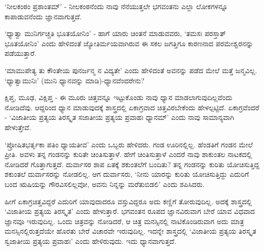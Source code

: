 `ನೀಲಕಂಠಂ ಪ್ರಶಾಂತಮ್' - ನೀಲಕಂಠನೆಂದು ನಾವು ನೆನೆಯುತ್ತಲೇ ಭಗವಂತನು ಎಲ್ಲಾ ಲೋಕಗಳನ್ನೂ ಕಾಪಾಡುವನೆಂದು ಜ್ಞಾನವಾಗುತ್ತದೆ.

`ಧ್ಯಾತ್ವಾ ಮುನಿರ್ಗಚ್ಚತಿ ಭೂತಯೋನಿಂ' - ಹಾಗೆ ಯಾರು ಚಿಂತನೆ ಮಾಡುವವರು, `ತಮಸಃ ಪರಸ್ತಾತ್ ಭೂತಯೋನಿಂ' ಎಂದು ಹೇಳಿದಂತೆ ಜ್ಯೋತಿರ್ಮಯವಾಗಿರುವ ಈ ಸಕಲ ಜಗತ್ತಿಗೂ ಕಾರಣನಾದ ಪರಮೇಶ್ವರನನ್ನು ಪಡೆಯುತ್ತಾರೆ.

`ಮಾಮುಪೇತ್ಯ ತು ಕೌಂತೇಯ ಪುನರ್ಜನ್ಮ ನ ವಿದ್ಯತೇ' ಎಂದು ಹೇಳಿದಂತೆ ಅವನನ್ನು ಪಡೆದ ಮೇಲೆ ಮತ್ತೆ ಜನ್ಮವಿಲ್ಲ. `ಧ್ಯಾತ್ವಾಮುನಿಃ' (ಮುನಿ ಧ್ಯಾನವನ್ನು ಮಾಡಿ)-ಧ್ಯಾನವೆಂದರೇನು?

ಕ್ಷಿಪ್ತ, ಮೂಢ, ವಿಕ್ಷಿಪ್ತ - ಈ ಮೂರು ಚಿತ್ತವನ್ನೂ ಇಟ್ಟುಕೊಂಡು ನಾವು ಧ್ಯಾನ ಮಾಡಲಾಗುವುದಿಲ್ಲವೆಂದು ನೋಡಿದೆವು. ಆದ್ದರಿಂದ ಧ್ಯಾನ ಮಾಡುವುದಕ್ಕೆ ಶಾಸ್ತ್ರದಲ್ಲಿ ಏಕಾಗ್ರವಾದ ಚಿತ್ತವಿರಬೇಕೆಂದು ಹೇಳಲ್ಪಟ್ಟಿದೆ. ಏಕಾಗ್ರವೆಂದರೆ - `ವಿಜಾತೀಯ ಪ್ರತ್ಯಯ ತಿರಸ್ಕೃತ ಸಜಾತೀಯ ಪ್ರತ್ಯಯ ಪ್ರವಾಹಃ ಧ್ಯಾನಮ್' ಎಂದು ನಾವು ಸಾಮಾನ್ಯವಾಗಿ ಹೇಳುತ್ತೇವೆ.

`ಪ್ರೋಷಿತಭರ್ತೃಕಾ ಪತಿಂ ಧ್ಯಾಯತೀವ' ಎಂದು ಒಬ್ಬರು ಹೇಳಿದರು. ಗಂಡ ಊರಿನಲ್ಲಿಲ್ಲ. ಹೆಂಡತಿಗೆ ಗಂಡನ ಮೇಲೆ ಪ್ರೀತಿ. ಅವಳು ತನ್ನ ಗಂಡನನ್ನು ಕುರಿತೇ ಚಿಂತಿಸುತ್ತಾಳೆ. ಹೇಗೆ ಚಿಂತಿಸುತ್ತಾಳೆ ಎಂದರೆ ನಾವು ಶಾಕುಂತಲ ನಾಟಕದಲ್ಲಿ ನೋಡಿದರೆ ಗೊತ್ತಾಗುತ್ತದೆ. ದುರ್ವಾಸರ ಶಾಪ ಏತಕ್ಕೆ ಶಕುಂತಲೆಗೆ ಬಂದಿತು? ತನ್ನ ಗಂಡನನ್ನು ಕುರಿತು ಯೋಚಿಸುತ್ತಿದ್ದ ಶಕುಂತಲೆ ದುರ್ವಾಸರನ್ನು ನೋಡಲಿಲ್ಲ. ಆಗ ದುರ್ವಾಸರು, `ನೀನು ಯಾರನ್ನು ಕುರಿತು ಯೋಚಿಸುತ್ತಿದ್ದು ಎದುರಿಗೆ ಬಂದ ಋಷಿಯನ್ನು ಗೌರವಿಸಲಿಲ್ಲವೋ, ಅವನು ನಿನ್ನನ್ನು ಮರೆತುಬಿಡಲಿ' ಎಂದು ಶಪಿಸಿದರು.

ಹೀಗೆ ಏಕಾಗ್ರಚಿತ್ತವಿದ್ದರೆ ಎದುರಿಗೆ ಯಾವುದಾದರೂ ವಸ್ತುವಿದ್ದರೂ ಅದು ಕಣ್ಣಿಗೆ ತೋರುವುದಿಲ್ಲ. ಅದಕ್ಕೆ ಶಾಸ್ತ್ರದಲ್ಲಿ `ವಿಜಾತೀಯ ಪ್ರತ್ಯಯ ತಿರಸ್ಕೃತ' ಎಂದು ಹೇಳುತ್ತಾರೆ. ಭಗವಂತನ ರೂಪದ ಜ್ಞಾನವಿರುವಾಗ ಬೇರೆ ಯಾವ ವಿಧವಾದ ಜ್ಞಾನವೂ ಇರುವುದಿಲ್ಲ. ಒಂದು ಚಿತ್ರವನ್ನು ನೋಡಿದರೆ, ಆ ಚಿತ್ರ ಮನಸ್ಸಿನಲ್ಲಿ ನಾಟಿಕೊಂಡಿರುವಾಗ ಅದು ಮಾತ್ರ ಮನಸ್ಸಿನಲ್ಲಿರುತ್ತದೆಯೇ ಹೊರತು ಬೇರೆ ವಿಚಾರವೇ ಇರುವುದಿಲ್ಲ. ಇದನ್ನೇ ಶಾಸ್ತ್ರದಲ್ಲಿ `ವಿಜಾತೀಯ ಪ್ರತ್ಯಯ ತಿರಸ್ಕೃತ ಸ್ವಜಾತೀಯ ಪ್ರತ್ಯಯ ಪ್ರವಾಹಃ' ಎಂದು ಹೇಳಿರುವುದು. ಇದು ಧ್ಯಾನವಾಗುತ್ತದೆ.


